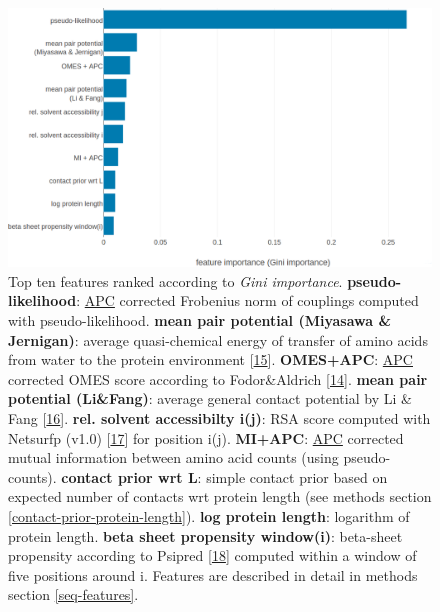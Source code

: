 \documentclass[12pt,a4paper,twoside]{book}
\theoremstyle{definition}
\theoremstyle{definition}
\theoremstyle{remark}
\begin{document}
\begin{figure}

{\centering \includegraphics[width=1\linewidth]{img/random_forest_contact_prior/pll_feature/feature_random_forest_top_pLLfeature} 

}

\caption{Top ten features
ranked according to \emph{Gini importance}. \textbf{pseudo-likelihood}:
\protect\hyperlink{abbrev}{APC} corrected Frobenius norm of couplings
computed with pseudo-likelihood. \textbf{mean pair potential (Miyasawa
\& Jernigan)}: average quasi-chemical energy of transfer of amino acids
from water to the protein environment
{[}\protect\hyperlink{ref-Miyazawa1999a}{15}{]}. \textbf{OMES+APC}:
\protect\hyperlink{abbrev}{APC} corrected OMES score according to
Fodor\&Aldrich {[}\protect\hyperlink{ref-Fodor2004a}{14}{]}.
\textbf{mean pair potential (Li\&Fang)}: average general contact
potential by Li \& Fang {[}\protect\hyperlink{ref-Li2011}{16}{]}.
\textbf{rel. solvent accessibilty i(j)}: RSA score computed with
Netsurfp (v1.0) {[}\protect\hyperlink{ref-Petersen2009a}{17}{]} for
position i(j). \textbf{MI+APC}: \protect\hyperlink{abbrev}{APC}
corrected mutual information between amino acid counts (using
pseudo-counts). \textbf{contact prior wrt L}: simple contact prior based
on expected number of contacts wrt protein length (see methods section
\ref{contact-prior-protein-length}). \textbf{log protein length}:
logarithm of protein length. \textbf{beta sheet propensity window(i)}:
beta-sheet propensity according to Psipred
{[}\protect\hyperlink{ref-Jones1999}{18}{]} computed within a window of
five positions around i. Features are described in detail in methods
section \ref{seq-features}.}\label{fig:feature-importance-rf-with-pll-score}
\end{figure}
\end{document}
